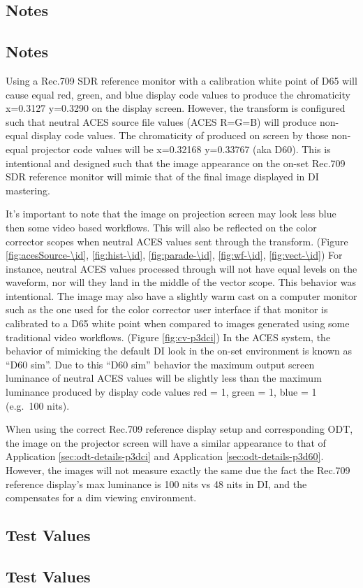 \subsection{Notes}
\label{subsec:notes-\id}

\subsection{Notes}
\label{subsec:notes-\id}

Using a Rec.709 SDR reference monitor with a calibration white point of D65 will cause equal red, green, and blue display code values to produce the chromaticity x=0.3127 y=0.3290 on the display screen. However, the \transformID{} transform is configured such that neutral ACES source file values (ACES R=G=B) will produce non-equal display code values. The chromaticity of produced on screen by those non-equal projector code values will be x=0.32168 y=0.33767 (aka D60).  This is intentional and designed such that the image appearance on the on-set Rec.709 SDR reference monitor will mimic that of the final image displayed in DI mastering.

It's important to note that the image on projection screen may look less blue then some video based workflows. This will also be reflected on the color corrector scopes when neutral ACES values sent through the \transformID{} transform. (Figure \ref{fig:acesSource-\id}, \ref{fig:hist-\id}, \ref{fig:parade-\id}, \ref{fig:wf-\id}, \ref{fig:vect-\id}) For instance, neutral ACES values processed through \transformID{} will not have equal levels on the waveform, nor will they land in the middle of the vector scope. This behavior was intentional. The image may also have a slightly warm cast on a computer monitor such as the one used for the color corrector user interface if that monitor is calibrated to a D65 white point when compared to images generated using some traditional video workflows. (Figure \ref{fig:cv-p3dci}) In the ACES system, the behavior of mimicking the default DI look in the on-set environment is known as ``D60 sim''. Due to this ``D60 sim'' behavior the maximum output screen luminance of neutral ACES values will be slightly less than the maximum luminance produced by display code values red = 1, green = 1, blue = 1 (e.g.~100 nits).

When using the correct Rec.709 reference display setup and corresponding ODT, the image on the projector screen will have a similar appearance to that of Application \ref{sec:odt-details-p3dci} and Application \ref{sec:odt-details-p3d60}.  However, the images will not measure exactly the same due the fact the Rec.709 reference display's max luminance is 100 nits vs 48 nits in DI, and the \transformID{} compensates for a dim viewing environment.


\subsection{Test Values}
\label{subsec:testValues-\id}

\testValuesSubSec{}

\subsection{Test Values}
\label{subsec:testValues-\id}

\testValuesSubSec{}